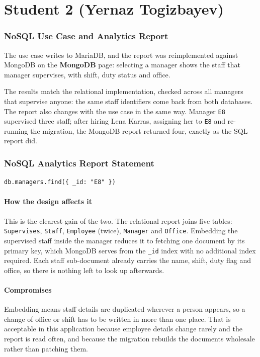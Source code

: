\documentclass[a4paper, 11pt]{article}          %
\begin{document}
\section*{Student 2 (Yernaz Togizbayev)}
\setcounter{subsubsection}{2}
\subsubsection{NoSQL Use Case and Analytics Report}

The use case writes to MariaDB, and the report was reimplemented against
MongoDB on the \textbf{MongoDB} page: selecting a manager shows the staff that
manager supervises, with shift, duty status and office.

The results match the relational implementation, checked across all managers
that supervise anyone: the same staff identifiers come back from both databases.
The report also changes with the use case in the same way. Manager \texttt{E8}
supervised three staff; after hiring Lena Karras, assigning her to \texttt{E8}
and re-running the migration, the MongoDB report returned four, exactly as the
SQL report did.

\subsubsection{NoSQL Analytics Report Statement}

\begin{lstlisting}
db.managers.find({ _id: "E8" })
\end{lstlisting}

\paragraph{How the design affects it} This is the clearest gain of the two.
The relational report joins five tables: \texttt{Supervises},
\texttt{Staff}, \texttt{Employee} (twice), \texttt{Manager} and \texttt{Office}.
Embedding the supervised staff inside the manager reduces it to fetching one
document by its primary key, which MongoDB serves from the \texttt{\_id} index
with no additional index required. Each staff sub-document already carries the
name, shift, duty flag and office, so there is nothing left to look up
afterwards.

\paragraph{Compromises} Embedding means staff details are duplicated wherever a
person appears, so a change of office or shift has to be written in more than
one place. That is acceptable in this application because employee details
change rarely and the report is read often, and because the migration rebuilds
the documents wholesale rather than patching them.
\end{document}
